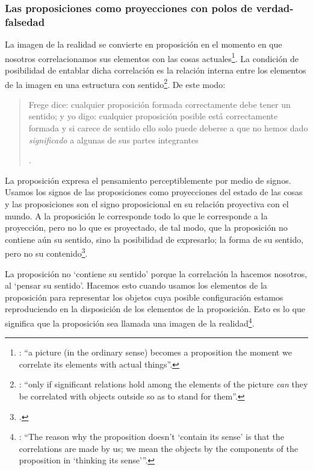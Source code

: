 \subsubsection{Las proposiciones como proyecciones con polos de verdad-falsedad}

La imagen de la realidad se convierte en proposición en el momento en que nosotros correlacionamos sus elementos con las cosas actuales\footnote{\cite[Cf.][73]{anscombe1959iwt}: \enquote{a picture (in the ordinary sense) becomes a proposition the moment we correlate its elements with actual things}.}. La condición de posibilidad de entablar dicha correlación es la relación interna entre los elementos de la imagen en una estructura con sentido\footnote{\cite[Cf.][68]{anscombe1959iwt}: \enquote{only if significant relations hold among the elements of the picture \emph{can} they be correlated with objects outside so as to stand for them}.}. De este modo: \blockquote[{\Cite[\S5.4733]{wittgenstein1922tractatuses}}.]{Frege dice: cualquier proposición formada correctamente debe tener un sentido; y yo digo: cualquier proposición posible está correctamente formada y si carece de sentido ello solo puede deberse a que no hemos dado \emph{significado} a algunas de sus partes integrantes}.

La proposición expresa el pensamiento perceptiblemente por medio de signos. Usamos los signos de las proposiciones como proyecciones del estado de las cosas y las proposiciones son el signo proposicional en su relación proyectiva con el mundo. A la proposición le corresponde todo lo que le corresponde a la proyección, pero no lo que es proyectado, de tal modo, que la proposición no contiene aún su sentido, sino la posibilidad de expresarlo; la forma de su sentido, pero no su contenido\footcite[Cf.][\S3.1, \S3.11-\S3.13]{wittgenstein1922tractatuses}.

La proposición no `contiene su sentido' porque la correlación la hacemos nosotros, al `pensar su sentido'. Hacemos esto cuando usamos los elementos de la proposición para representar los objetos cuya posible configuración estamos reproduciendo en la disposición de los elementos de la proposición. Esto es lo que significa que la proposición sea llamada una imagen de la realidad\footnote{\cite[Cf.][69]{anscombe1959iwt}: \enquote{The reason why the proposition doesn't `contain its sense' is that the correlations are made by us; we mean the objects by the components of the proposition in `thinking its sense'}.}.

